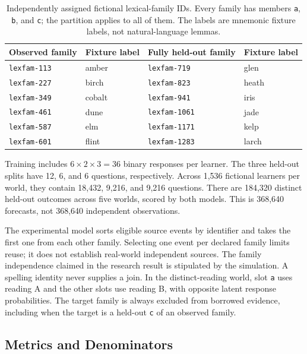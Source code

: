 \documentclass{article}
\begin{document}
\begin{table}[ht]
\caption{Independently assigned fictional lexical-family IDs. Every family has members \texttt{a}, \texttt{b}, and \texttt{c}; the partition applies to all of them. The labels are mnemonic fixture labels, not natural-language lemmas.}
\centering
\begin{tabular}{llll}
\toprule
Observed family & Fixture label & Fully held-out family & Fixture label \\
\midrule
\texttt{lexfam-113} & amber & \texttt{lexfam-719} & glen \\
\texttt{lexfam-227} & birch & \texttt{lexfam-823} & heath \\
\texttt{lexfam-349} & cobalt & \texttt{lexfam-941} & iris \\
\texttt{lexfam-461} & dune & \texttt{lexfam-1061} & jade \\
\texttt{lexfam-587} & elm & \texttt{lexfam-1171} & kelp \\
\texttt{lexfam-601} & flint & \texttt{lexfam-1283} & larch \\
\bottomrule
\end{tabular}
\end{table}

Training includes $6\times2\times3=36$ binary responses per learner. The three held-out splits have 12, 6, and 6 questions, respectively. Across 1,536 fictional learners per world, they contain 18,432, 9,216, and 9,216 questions. There are 184,320 distinct held-out outcomes across five worlds, scored by both models. This is 368,640 forecasts, not 368,640 independent observations.

The experimental model sorts eligible source events by identifier and takes the first one from each other family. Selecting one event per declared family limits reuse; it does not establish real-world independent sources. The family independence claimed in the research result is stipulated by the simulation. A spelling identity never supplies a join. In the distinct-reading world, slot \texttt{a} uses reading A and the other slots use reading B, with opposite latent response probabilities. The target family is always excluded from borrowed evidence, including when the target is a held-out \texttt{c} of an observed family.

\subsection{Metrics and Denominators}
\end{document}

